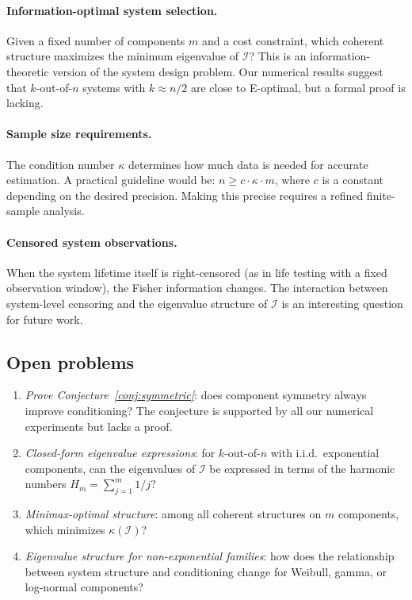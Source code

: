 \documentclass[12pt]{article}
\theoremstyle{definition}
\theoremstyle{remark}
\begin{document}
\paragraph{Information-optimal system selection.}
Given a fixed number of components $m$ and a cost constraint, which
coherent structure maximizes the minimum eigenvalue of $\mathcal{I}$?
This is an information-theoretic version of the system design problem.
Our numerical results suggest that $k$-out-of-$n$ systems with
$k \approx n/2$ are close to E-optimal, but a formal proof is lacking.

\paragraph{Sample size requirements.}
The condition number $\kappa$ determines how much data is needed for
accurate estimation.  A practical guideline would be:
$n \geq c \cdot \kappa \cdot m$, where $c$ is a constant depending
on the desired precision.  Making this precise requires a refined
finite-sample analysis.

\paragraph{Censored system observations.}
When the system lifetime itself is right-censored (as in life testing
with a fixed observation window), the Fisher information changes.  The
interaction between system-level censoring and the eigenvalue structure
of $\mathcal{I}$ is an interesting question for future work.

\subsection{Open problems}
\label{sec:open-problems}

\begin{enumerate}[leftmargin=2em]
  \item \emph{Prove Conjecture~\ref{conj:symmetric}}: does component
    symmetry always improve conditioning?  The conjecture is supported
    by all our numerical experiments but lacks a proof.

  \item \emph{Closed-form eigenvalue expressions}: for $k$-out-of-$n$
    with i.i.d.\ exponential components, can the eigenvalues of
    $\mathcal{I}$ be expressed in terms of the harmonic numbers
    $H_m = \sum_{j=1}^m 1/j$?

  \item \emph{Minimax-optimal structure}: among all coherent structures
    on $m$ components, which minimizes $\kappa(\mathcal{I})$?

  \item \emph{Eigenvalue structure for non-exponential families}:
    how does the relationship between system structure and conditioning
    change for Weibull, gamma, or log-normal components?
\end{enumerate}
\end{document}
